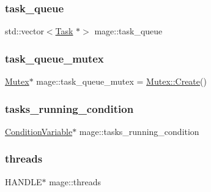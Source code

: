 \hypertarget{namespacemage_adc0172060af06a43cdcc54a5bb2b046c}{}\label{namespacemage_adc0172060af06a43cdcc54a5bb2b046c} 
\subsubsection{\texorpdfstring{task\+\_\+queue}{task\_queue}}
{\footnotesize\ttfamily std\+::vector$<$\hyperlink{classmage_1_1_task}{Task} $\ast$$>$ mage\+::task\+\_\+queue\hspace{0.3cm}{\ttfamily [static]}}

\hypertarget{namespacemage_a7de4544ddddcf8e0d54dbfdc0778f13f}{}\label{namespacemage_a7de4544ddddcf8e0d54dbfdc0778f13f} 
\subsubsection{\texorpdfstring{task\+\_\+queue\+\_\+mutex}{task\_queue\_mutex}}
{\footnotesize\ttfamily \hyperlink{classmage_1_1_mutex}{Mutex}$\ast$ mage\+::task\+\_\+queue\+\_\+mutex = \hyperlink{classmage_1_1_mutex_a48d784fa6bffd4088d9f89a2a9cca84e}{Mutex\+::\+Create}()\hspace{0.3cm}{\ttfamily [static]}}

\hypertarget{namespacemage_a8c04b4285ebbc0fb416b1905c01cf149}{}\label{namespacemage_a8c04b4285ebbc0fb416b1905c01cf149} 
\subsubsection{\texorpdfstring{tasks\+\_\+running\+\_\+condition}{tasks\_running\_condition}}
{\footnotesize\ttfamily \hyperlink{classmage_1_1_condition_variable}{Condition\+Variable}$\ast$ mage\+::tasks\+\_\+running\+\_\+condition\hspace{0.3cm}{\ttfamily [static]}}

\hypertarget{namespacemage_a15e9f7d36194ec1b768a82a2294cce6c}{}\label{namespacemage_a15e9f7d36194ec1b768a82a2294cce6c} 
\subsubsection{\texorpdfstring{threads}{threads}}
{\footnotesize\ttfamily H\+A\+N\+D\+LE$\ast$ mage\+::threads\hspace{0.3cm}{\ttfamily [static]}}

